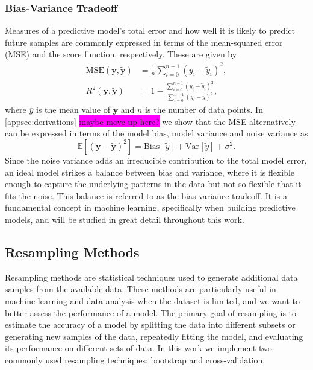 \documentclass[aps,pra,english,notitlepage,reprint,nofootinbib]{revtex4-1}  %
\begin{document}
\subsubsection{Bias-Variance Tradeoff}
Measures of a predictive model's total error and how well it is likely to predict future samples are commonly expressed in terms of the mean-squared error (MSE) and the score function, respectively. These are given by
\begin{align}
  \text{MSE}(\mathbf{y},\mathbf{\tilde{y}}) &= \frac{1}{n}\sum_{i=0}^{n-1}\left(y_i-\tilde{y}_i\right)^2,
  \\
  R^2(\mathbf{y},\mathbf{\tilde{y}}) &= 1 -\frac{\sum_{i=0}^{n-1}\left(y_i-\tilde{y}_i\right)^2}{\sum_{i=0}^{n-1}\left(y_i-\overline{y}\right)^2},
\end{align}
where $\overline{y}$ is the mean value of $\mathbf{y}$ and $n$ is the number of data points. In \cref{appsec:derivations} \colorbox{magenta}{maybe move up here?} we show that the MSE alternatively can be expressed in terms of the model bias, model variance and noise variance as 
\begin{equation}
  \mathbb{E}\left[(\mathbf{y}-\mathbf{\tilde{y}})^2 \right] = \text{Bias}[\tilde{y}] + \text{Var}[\tilde{y}] + \sigma^2. \label{eq:model error}
\end{equation}
Since the noise variance adds an irreducible contribution to the total model error, an ideal model strikes a balance between bias and variance, where it is flexible enough to capture the underlying patterns in the data but not so flexible that it fits the noise. This balance is referred to as the bias-variance tradeoff. It is a fundamental concept in machine learning, specifically when building predictive models, and will be studied in great detail throughout this work.


\subsection{Resampling Methods}
Resampling methods are statistical techniques used to generate additional data samples from the available data. These methods are particularly useful in machine learning and data analysis when the dataset is limited, and we want to better assess the performance of a model. The primary goal of resampling is to estimate the accuracy of a model by splitting the data into different subsets or generating new samples of the data, repeatedly fitting the model, and evaluating its performance on different sets of data. In this work we implement two commonly used resampling techniques: bootstrap and cross-validation.
\end{document}
